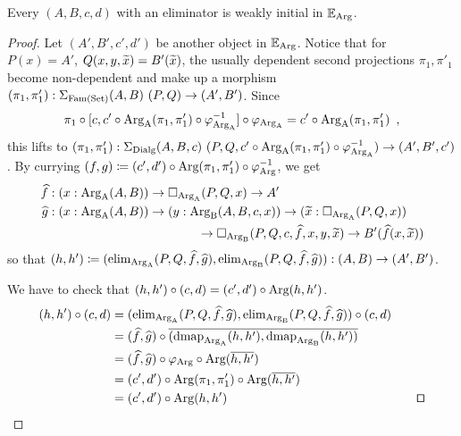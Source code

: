 \documentclass[orivec,envcountsame, ,envcountsect]{llncs}
\begin{document}
\begin{proposition}
\label{thm:elim-to-weak-init}
  Every $(A, B, c, d)$ with an eliminator is weakly initial in $\mathbb{E}_{\text{Arg}}$.
\end{proposition}
\begin{proof}
  Let $(A', B', c', d')$ be another object in
  $\mathbb{E}_{\text{Arg}}$. Notice that for $P(x) = A'$, $Q(x, y,
  \widetilde{x}) = B'(\widetilde{x})$, the usually dependent second
  projections $\pi_1, \pi'_1$ become non-dependent and make up a
  morphism $(\pi_1, \pi'_1) : \Sigma_{\text{Fam}(\text{Set})} (A, B)\ (P, Q) \to (A', B')$. 
  Since
   \[
   \pi_1 \circ [c, c' \circ \text{Arg}_{\text{A}}(\pi_1, \pi'_1) \circ \varphi_{\text{Arg}_{\text{A}}}^{-1}]
         \circ \varphi_{\text{Arg}_{\text{A}}} = c' \circ \text{Arg}_{\text{A}}(\pi_1, \pi'_1) \enspace ,
   \]
   this lifts to $(\pi_1, \pi'_1) : \Sigma_{\text{Dialg}} (A, B, c)\ (P, Q, c'
   \circ \text{Arg}_{\text{A}}(\pi_1, \pi'_1) \circ \varphi_{\text{Arg}_{\text{A}}}^{-1}) \to (A', B',
   c')$. By currying $(f, g) \coloneqq (c', d') \circ \text{Arg}(\pi_1,
   \pi'_1) \circ \varphi_{\text{Arg}}^{-1}$, we get
   \begin{align*} 
     \widehat{f} &: (x : \text{Arg}_{\text{A}}(A, B)) \to \Box_{\text{Arg}_{\text{A}}}(P, Q, x) \to A' \\ 
     \widehat{g} &: (x : \text{Arg}_{\text{A}}(A, B)) \to (y : \text{Arg}_{\text{B}}(A, B, c, x))
     \to
     (\widetilde{x} : \Box_{\text{Arg}_{\text{A}}}(P, Q, x))  \\
     & \qquad\qquad\qquad\qquad\qquad\qquad \to \Box_{\text{Arg}_{\text{B}}}(P, Q, c, \widehat{f}, x, y,
     \widetilde{x}) \to B'(\widehat{f}(x, \widetilde{x}))
   \end{align*}
   so that $(h, h') \coloneqq (\text{elim}_{\text{Arg}_{\text{A}}}(P, Q, \widehat{f}, \widehat{g}),
   \text{elim}_{\text{Arg}_{\text{B}}}(P, Q, \widehat{f}, \widehat{g})) : (A, B) \to (A', B')$.

   We have to check that $(h, h') \circ (c, d) = (c', d') \circ \text{Arg}(h, h')$.
   \begin{align*}
     (h, h') \circ (c, d)
     &= (\elim_{\ArgA}(P, Q, \widehat{f}, \widehat{g}),
          \elim_{\ArgBpp}(P, Q, \widehat{f}, \widehat{g})) \circ (c, d) \\
     &= (\widehat{f}, \widehat{g}) \circ \CwFsect{(\dmap_{\ArgA}(h, h'), \dmap_{\ArgBpp}(h, h'))} \\
     &= (\widehat{f}, \widehat{g}) \circ \varphi_{\ArgB} \circ \ArgB(\CwFsect{h, h'}) \\
     &= (c', d') \circ \ArgB(\pi_1, \pi'_1) \circ \ArgB(\CwFsect{h, h'}) \\
     &= (c', d') \circ \ArgB(h, h') & \text{\qed}
   \end{align*}
\end{proof}
\end{document}
